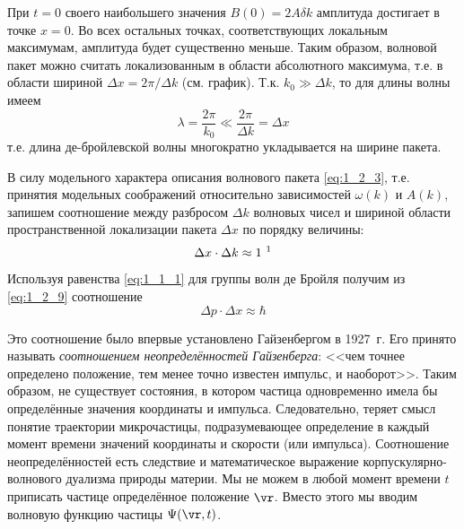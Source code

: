 При $t = 0$ своего наибольшего значения $B(0) = 2A \delta k$ амплитуда достигает в точке $x = 0$. Во всех остальных точках, соответствующих локальным максимумам, амплитуда будет существенно меньше. Таким образом, волновой пакет можно считать локализованным в области абсолютного максимума, т.е. в области шириной $\Delta x = 2\pi / \Delta k$ (см. график). Т.к. $k_0 \gg \Delta k$, то для длины волны имеем
$$
\lambda = \frac{2 \pi}{k_0} \ll \frac{2 \pi}{\Delta k} = \Delta x
$$%
%
т.е. длина де-бройлевской волны многократно укладывается на ширине пакета.

В силу модельного характера описания волнового пакета \eqref{eq:1_2_3}, т.е. принятия модельных соображений относительно зависимостей $\omega(k)$ и $A(k)$, запишем соотношение между разбросом $\Delta k$ волновых чисел и шириной области пространственной локализации пакета $\Delta x$ по порядку величины:
\begin{equation}
\label{eq:1_2_9}
\Delta x \cdot \Delta k \approx 1 ~\text{\footnotemark{}}
\end{equation}


Используя равенства \eqref{eq:1_1_1} для группы волн де Бройля получим из \eqref{eq:1_2_9} соотношение
\begin{equation}
\label{eq:1_2_10}
\boxed{\Delta p \cdot \Delta x \approx \hbar}
\end{equation}

Это соотношение было впервые установлено Гайзенбергом\footnotemark{} в 1927~г. Его принято называть {\em соотношением неопределённостей Гайзенберга}: <<чем точнее определено положение, тем менее точно известен импульс, и наоборот>>. Таким образом, не существует состояния, в котором частица одновременно имела бы определённые значения координаты и импульса. Следовательно, теряет смысл понятие траектории микрочастицы, подразумевающее определение в каждый момент времени значений координаты и скорости (или импульса). Соотношение неопределённостей есть следствие и математическое выражение корпускулярно-волнового дуализма природы материи. Мы не можем в любой момент времени $t$ приписать частице определённое положение $\vr$. Вместо этого мы вводим волновую функцию частицы $\Psi(\vr, t)$.


